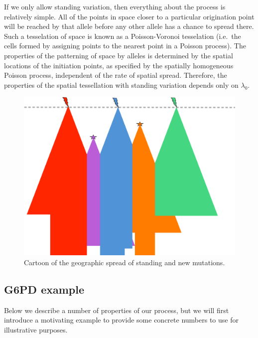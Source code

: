 \documentclass{article}
\begin{document}
If we only allow standing variation, then everything about the process is relatively simple. 
All of the points in space closer to a particular origination point will be
reached by that allele before any other allele has a chance to spread there. 
Such a tesselation of space is known as a Poisson-Voronoi tesselation \citep{poissonvoronoi}
(i.e.\ the cells formed by assigning points to the nearest point in a Poisson process).
The properties of the patterning of space by alleles is
determined by the spatial locations of the initiation points, 
as specified by the spatially homogeneous Poisson process, 
independent of the rate of spatial spread. 
Therefore, the properties of the spatial tessellation with standing variation depends only on $\lambda_0$.


\begin{figure}[ht]
  \begin{center}
    \includegraphics{spreading_alleles_trimmed}
  \end{center}
  \caption{
Cartoon of the geographic spread of standing and new mutations. 
}
  \label{fig:cartoon}
  
\end{figure}



\subsection{G6PD example}

Below we describe a number of properties of our process, but we will first introduce 
a motivating example to provide some concrete
numbers to use for illustrative purposes.
\end{document}
